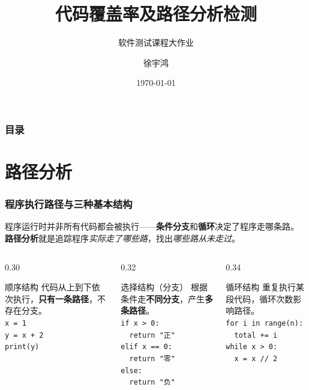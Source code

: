 \documentclass[presentation,aspectratio=169,fontset=none]{ctexbeamer}
\title{代码覆盖率及路径分析检测}
\subtitle{软件测试课程大作业}
\author{徐宇鸿}
\institute
{
计算机科学与工程学院 \\ %
\medskip
}
\date{\today}
\begin{document}
\begin{frame}
\titlepage
\end{frame}

\begin{frame}
\frametitle{目录}
\tableofcontents
\end{frame}


\section{路径分析}

\begin{frame}[fragile]
\frametitle{程序执行路径与三种基本结构}
{\small 程序运行时并非所有代码都会被执行——\textbf{条件分支}和\textbf{循环}决定了程序走哪条路。%
\textbf{路径分析}就是追踪程序\emph{实际走了哪些路}，找出\emph{哪些路从未走过}。}

\vspace{0.15cm}
\begin{columns}[T]
\begin{column}{0.30\textwidth}
\begin{block}{\small 顺序结构}
{\scriptsize
代码从上到下依次执行，\textbf{只有一条路径}，不存在分支。\\[2pt]
\texttt{x = 1}\\
\texttt{y = x + 2}\\
\texttt{print(y)}}
\end{block}
\end{column}
\begin{column}{0.32\textwidth}
\begin{block}{\small 选择结构（分支）}
{\scriptsize
根据条件走\textbf{不同分支}，产生\textbf{多条路径}。\\[2pt]
\texttt{if x > 0:}\\
\texttt{~~return "正"}\\
\texttt{elif x == 0:}\\
\texttt{~~return "零"}\\
\texttt{else:}\\
\texttt{~~return "负"}}
\end{block}
\end{column}
\begin{column}{0.34\textwidth}
\begin{block}{\small 循环结构}
{\scriptsize
重复执行某段代码，循环次数影响路径。\\[2pt]
\texttt{for i in range(n):}\\
\texttt{~~total += i}\\[3pt]
\texttt{while x > 0:}\\
\texttt{~~x = x // 2}}
\end{block}
\end{column}
\end{columns}


\end{frame}
\end{document}

